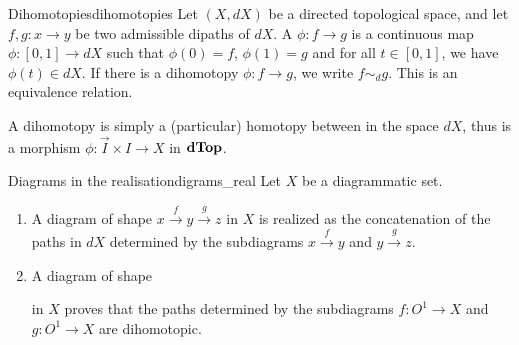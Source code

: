 \begin{cdef}{Dihomotopies}{dihomotopies}
    Let \( (X, dX) \) be a directed topological space, and let \( f, g : x \to y \) be two admissible dipaths of \( dX \). A  \( \phi : f \to g \) is a continuous map \( \phi : [0, 1] \to dX \) such that \( \phi(0) = f \), \( \phi(1) = g \) and for all \( t \in [0, 1] \), we have \( \phi(t) \in dX \). If there is a dihomotopy \( \phi : f \to g \), we write \( f \sim_d g \). This is an equivalence relation. 
\end{cdef}
A dihomotopy is simply a (particular) homotopy between in the space \( dX \), thus is a morphism \( \phi : \vec{I} \times I \to X \) in \( \mathbf{dTop} \).
\begin{clem}{Diagrams in the realisation}{digrams_real}
    Let \( X \) be a diagrammatic set. 
    \begin{enumerate}
        \item A diagram of shape \( x \stackrel{f}{\to} y \stackrel{g}{\to} z \) in \( X \) is realized as the concatenation of the paths in \( dX \) determined by the subdiagrams \( x \stackrel{f}{\to} y \) and \( y \stackrel{g}{\to} z \).
        \item A diagram of shape 
        \begin{center}
        \end{center}
        in \( X \) proves that the paths determined by the subdiagrams \( f : O^1 \to X \) and \( g : O^1 \to X \) are dihomotopic. 
    \end{enumerate}
\end{clem}
